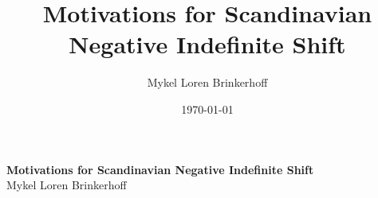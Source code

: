 \documentclass[12pt, letterpaper]{article}
\title{Motivations for Scandinavian Negative Indefinite Shift}
\author{Mykel Loren Brinkerhoff}
\date{\today}
\begin{document}
	
	\onehalfspacing
	
\begin{center}
	{\Large \textbf{Motivations for Scandinavian Negative Indefinite Shift}}\\
	\vspace{6pt}
	Mykel Loren Brinkerhoff\\
\end{center}
\thispagestyle{fancy}


\end{document}
